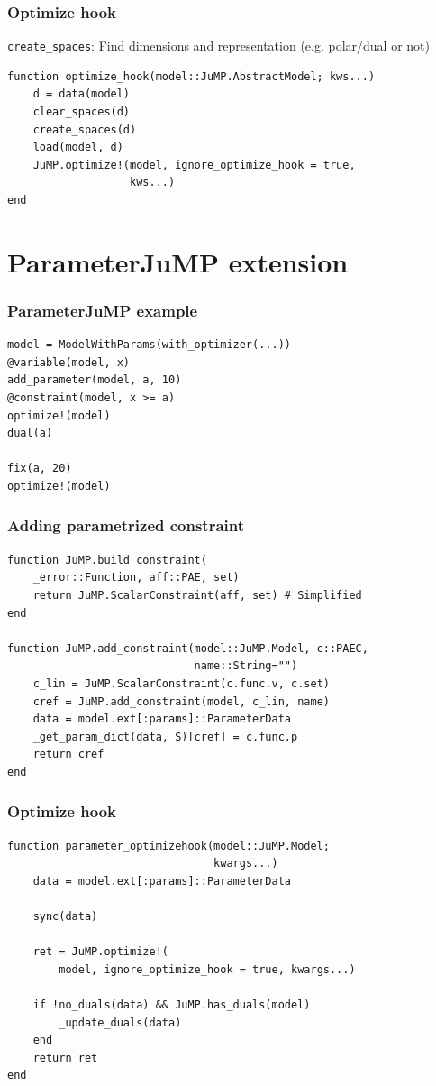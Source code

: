 \documentclass{beamer}
\begin{document}
\begin{frame}[fragile]
  \frametitle{Optimize hook}
  \verb|create_spaces|: Find dimensions and
  representation (e.g. polar/dual or not)
  \begin{verbatim}
function optimize_hook(model::JuMP.AbstractModel; kws...)
    d = data(model)
    clear_spaces(d)
    create_spaces(d)
    load(model, d)
    JuMP.optimize!(model, ignore_optimize_hook = true,
                   kws...)
end
  \end{verbatim}
\end{frame}

\section{ParameterJuMP extension}

\begin{frame}[fragile]
  \frametitle{ParameterJuMP example}
  \begin{verbatim}
model = ModelWithParams(with_optimizer(...))
@variable(model, x)
add_parameter(model, a, 10)
@constraint(model, x >= a)
optimize!(model)
dual(a)

fix(a, 20)
optimize!(model)
  \end{verbatim}
\end{frame}

\begin{frame}[fragile]
  \frametitle{Adding parametrized constraint}
  \begin{verbatim}
function JuMP.build_constraint(
    _error::Function, aff::PAE, set)
    return JuMP.ScalarConstraint(aff, set) # Simplified
end

function JuMP.add_constraint(model::JuMP.Model, c::PAEC,
                             name::String="")
    c_lin = JuMP.ScalarConstraint(c.func.v, c.set)
    cref = JuMP.add_constraint(model, c_lin, name)
    data = model.ext[:params]::ParameterData
    _get_param_dict(data, S)[cref] = c.func.p
    return cref
end
  \end{verbatim}
\end{frame}

\begin{frame}[fragile]
  \frametitle{Optimize hook}
  \begin{verbatim}
function parameter_optimizehook(model::JuMP.Model;
                                kwargs...)
    data = model.ext[:params]::ParameterData

    sync(data)

    ret = JuMP.optimize!(
        model, ignore_optimize_hook = true, kwargs...)

    if !no_duals(data) && JuMP.has_duals(model)
        _update_duals(data)
    end
    return ret
end
  \end{verbatim}
\end{frame}
\end{document}
